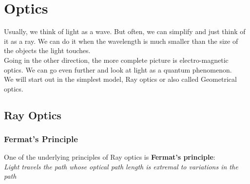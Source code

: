 \section{Optics}

Usually, we think of light as a wave. But often, we can simplify and just think of it as a ray. We can do it when the wavelength is much smaller than the size of the objects the light touches.\\

Going in the other direction, the more complete picture is electro-magnetic optics. We can go even further and look at light as a quantum phenomenon.\\

We will start out in the simplest model, Ray optics or also called Geometrical optics.


\subsection{Ray Optics}
\subsubsection{Fermat's Principle}
One of the underlying principles of Ray optics is \textbf{Fermat's principle}:\\
\emph{Light travels the path whose optical path length is extremal to variations in the path}
\\

